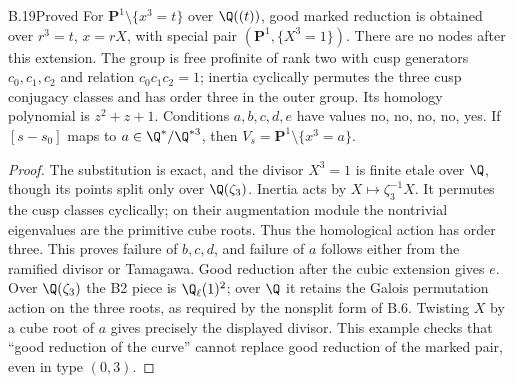 \begin{claim}{B.19}{Proved}
For $\mathbf P^1\setminus\{x^3=t\}$ over $\Q((t))$, good marked reduction
is obtained over $r^3=t$, $x=rX$, with special pair
$(\mathbf P^1,\{X^3=1\})$. There are no nodes after this extension. The
group is free profinite of rank two with cusp generators
$c_0,c_1,c_2$ and relation $c_0c_1c_2=1$; inertia cyclically permutes the
three cusp conjugacy classes and has order three in the outer group.
Its homology polynomial is $z^2+z+1$. Conditions $a,b,c,d,e$ have values
no, no, no, no, yes. If $[s-s_0]$ maps to $a\in\Q^*/\Q^{*3}$, then
$V_s=\mathbf P^1\setminus\{x^3=a\}$.
\end{claim}
\begin{proof}
The substitution is exact, and the divisor $X^3=1$ is finite etale over
$\Q$, though its points split only over $\Q(\zeta_3)$. Inertia acts by
$X\mapsto\zeta_3^{-1}X$. It permutes the cusp classes cyclically; on their
augmentation module the nontrivial eigenvalues are the primitive cube
roots. Thus the homological action has order three. This proves failure of
$b,c,d$, and failure of $a$ follows either from the ramified divisor or
Tamagawa. Good reduction after the cubic extension gives $e$.
Over $\Q(\zeta_3)$ the B2 piece is $\Q_\ell(1)^2$; over $\Q$ it retains
the Galois permutation action on the three roots, as required by the
nonsplit form of B.6. Twisting $X$ by a cube root of $a$ gives precisely
the displayed divisor. This example checks that ``good reduction of the
curve'' cannot replace good reduction of the marked pair, even in type
$(0,3)$.
\end{proof}


